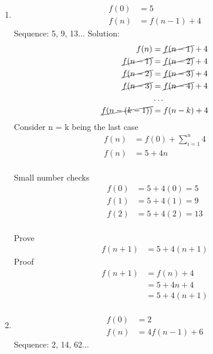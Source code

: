 \documentclass{article}
\begin{document}
\begin{enumerate}
\item
  \begin{align*}
    f(0) &= 5\\
    f(n) &= f(n-1) + 4
  \end{align*}
  Sequence:
  5, 9, 13...
  Solution:
  \begin{align*}
    f(n) &= \cancel{f(n-1)}+4\\ 
    \cancel{f(n-1)} &= \cancel{f(n-2)} +4\\ 
    \cancel{f(n-2)} &= \cancel{f(n-3)} +4\\
    \cancel{f(n-3)} &= \cancel{f(n-4)} +4\\
    &\ldots\\
    \cancel{f(n-(k-1))} &= f(n-k)+4
  \end{align*}
  Consider n = k being the last case
  \begin{align*}
    f(n) &= f(0)+ \sum_{i=1}^{n}4 \\
    f(n) &= 5 + 4n \\
  \end{align*}
  
  Small number checks
  \begin{align*}
    f(0) &= 5 + 4(0) = 5\\
    f(1) &= 5 + 4(1) = 9\\
    f(2) &= 5 + 4(2) = 13\\
  \end{align*}

  Prove
  \begin{align*}
    f(n+1) &= 5 + 4(n + 1)
  \end{align*}
  Proof
  \begin{align*}
    f(n+1) &= f(n) + 4 \\
    &=  5 + 4n + 4 \\
    &=  5 + 4(n + 1)\\
  \end{align*}

\item
  \begin{align*}
    f(0) &= 2\\
    f(n) &= 4f(n-1) + 6
  \end{align*}
  Sequence:
  2, 14, 62...


\end{enumerate}
\end{document}
